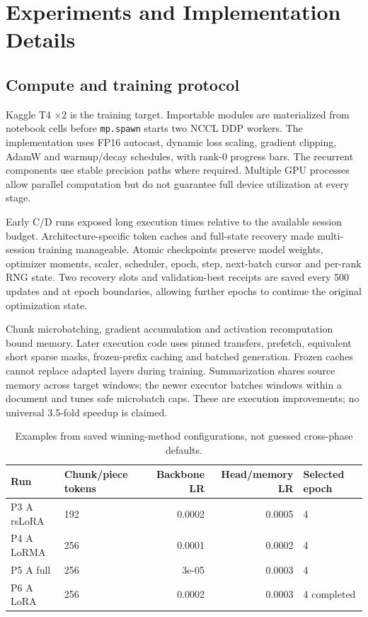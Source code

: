 \documentclass[11pt, oneside]{article}
\begin{document}
\section{Experiments and Implementation Details}
\subsection{Compute and training protocol}
Kaggle T4 $\times2$ is the training target. Importable modules are materialized from
notebook cells before \texttt{mp.spawn} starts two NCCL DDP workers. The implementation
uses FP16 autocast, dynamic loss scaling, gradient clipping, AdamW and warmup/decay
schedules, with rank-0 progress bars. The recurrent components use stable precision
paths where required. Multiple GPU processes allow parallel computation but do not
guarantee full device utilization at every stage.

Early C/D runs exposed long execution times relative to the available session budget.
Architecture-specific token caches and full-state recovery made multi-session training
manageable. Atomic checkpoints preserve model weights, optimizer moments, scaler,
scheduler, epoch, step, next-batch cursor and per-rank RNG state. Two recovery slots
and validation-best receipts are saved every 500 updates and at epoch boundaries,
allowing further epochs to continue the original optimization state.

Chunk microbatching, gradient accumulation and activation recomputation bound memory.
Later execution code uses pinned transfers, prefetch, equivalent short sparse masks,
frozen-prefix caching and batched generation. Frozen caches cannot replace adapted
layers during training. Summarization shares source memory across target windows;
the newer executor batches windows within a document and tunes safe microbatch caps.
These are execution improvements; no universal 3.5-fold speedup is claimed.

\begin{table}[H]\centering\small
\caption{Examples from saved winning-method configurations, not guessed cross-phase defaults.}
\begin{tabular}{llrrl}\toprule
Run & Chunk/piece tokens & Backbone LR & Head/memory LR & Selected epoch\\\midrule
P3 A rsLoRA & 192 & 0.0002 & 0.0005 & 4\\
P4 A LoRMA & 256 & 0.0001 & 0.0002 & 4\\
P5 A full & 256 & 3e-05 & 0.0003 & 4\\
P6 A LoRA & 256 & 0.0002 & 0.0003 & 4 completed\\\bottomrule
\end{tabular}\end{table}
\end{document}
